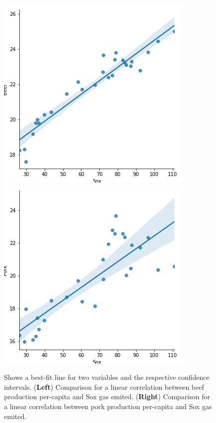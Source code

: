 \documentclass[11pt]{article}
\numberwithin{equation}{section}
\begin{document}
\begin{figure}[t]
\centering
\includegraphics[width=0.30\paperwidth, clip=true, trim=0mm 0mm 0mm 0mm]{figures/Sox_Beef}
\includegraphics[width=0.30\paperwidth, clip=true, trim=0mm 0mm 0mm 0mm]{figures/Sox_Pork}

\caption{Shows  a best-fit line for two variables and the respective confidence intervals. (\textbf{Left}) Comparison for a linear correlation between beef production per-capita and Sox gas emited. (\textbf{Right}) Comparison for a linear correlation between pork production per-capita and Sox gas emited. 
}
\label{Example5fig}
\end{figure}
\end{document}
